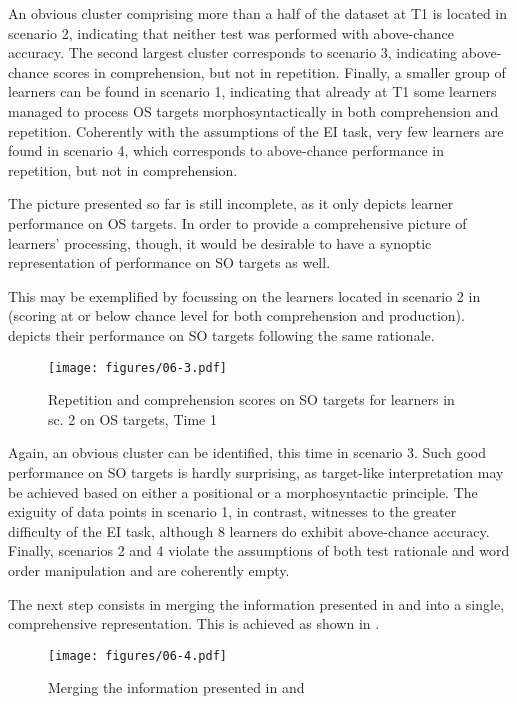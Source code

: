 An obvious cluster comprising more than a half of the dataset at T1 is located in scenario 2, indicating that neither test was performed with above-chance accuracy. The second largest cluster corresponds to scenario 3, indicating above-chance scores in comprehension, but not in repetition. Finally, a smaller group of learners can be found in scenario 1, indicating that already at T1 some learners managed to process OS targets morphosyntactically in both comprehension and repetition. Coherently with the assumptions of the EI task, very few learners are found in scenario 4, which corresponds to above-chance performance in repetition, but not in comprehension.

The picture presented so far is still incomplete, as it only depicts learner performance on OS targets. In order to provide a comprehensive picture of learners' processing, though, it would be desirable to have a synoptic representation of performance on SO targets as well. 

This may be exemplified by focussing on the learners located in scenario 2 in  (scoring at or below chance level for both comprehension and production).  depicts their performance on SO targets following the same rationale. 

\begin{figure}
    \texttt{[image: figures/06-3.pdf]}
    \caption{Repetition and comprehension scores on SO targets for learners in sc. 2 on OS targets, Time 1}
    \label{fig:06:3}
\end{figure}

Again, an obvious cluster can be identified, this time in scenario 3. Such good performance on SO targets is hardly surprising, as target-like interpretation may be achieved based on either a positional or a morphosyntactic principle. The exiguity of data points in scenario 1, in contrast, witnesses to the greater difficulty of the EI task, although 8 learners do exhibit above-chance accuracy. Finally, scenarios 2 and 4 violate the assumptions of both test rationale and word order manipulation and are coherently empty.

\newpage
The next step consists in merging the information presented in  and  into a single, comprehensive representation. This is achieved as shown in .

\begin{figure}
    \texttt{[image: figures/06-4.pdf]}
    \caption{Merging the information presented in  and }
    \label{fig:06:4}
\end{figure}

